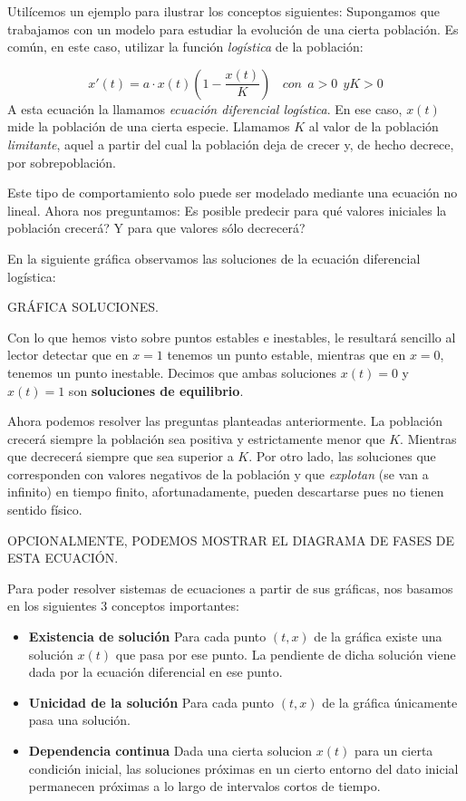 Utilícemos un ejemplo para ilustrar los conceptos siguientes: Supongamos que trabajamos con un modelo para estudiar la evolución de una cierta población. Es común, en este caso, utilizar la función \emph{logística} de la población:

\begin{equation}
x'(t) = a\cdot x(t)(1-\frac{x(t)}{K})~~~~con~~a>0~~yK>0
\end{equation}
A esta ecuación la llamamos \emph{ecuación diferencial logística}. En ese caso, $x(t)$ mide la población de una cierta especie. Llamamos $K$ al valor de la población \emph{limitante}, aquel a partir del cual la población deja de crecer y, de hecho decrece, por sobrepoblación.

Este tipo de comportamiento solo puede ser modelado mediante una ecuación no lineal. Ahora nos preguntamos: Es posible predecir para qué valores iniciales la población crecerá? Y para que valores sólo decrecerá?

En la siguiente gráfica observamos las soluciones de la ecuación diferencial logística:\newline

GRÁFICA SOLUCIONES.\newline

Con lo que hemos visto sobre puntos estables e inestables, le resultará sencillo al lector detectar que en $x=1$ tenemos un punto estable, mientras que en $x=0$, tenemos un punto inestable. Decimos que ambas soluciones $x(t) = 0$ y $x(t) = 1$ son \textbf{soluciones de equilibrio}. 

Ahora podemos resolver las preguntas planteadas anteriormente. La población crecerá siempre la población sea positiva y estrictamente menor que $K$. Mientras que decrecerá siempre que sea superior a $K$. Por otro lado, las soluciones que corresponden con valores negativos de la población y que \emph{explotan} (se van a infinito) en tiempo finito, afortunadamente, pueden descartarse pues no tienen sentido físico.\newline

OPCIONALMENTE, PODEMOS MOSTRAR EL DIAGRAMA DE FASES DE ESTA ECUACIÓN.\newline

Para poder resolver sistemas de ecuaciones a partir de sus gráficas, nos basamos en los siguientes 3 conceptos importantes:

\begin{itemize}
\item \textbf{Existencia de solución} Para cada punto $(t,x)$ de la gráfica existe una  solución $x(t)$ que pasa por ese punto. La pendiente de dicha solución viene dada por la ecuación diferencial en ese punto.
\item \textbf{Unicidad de la solución} Para cada punto $(t,x)$ de la gráfica únicamente pasa una solución.
\item \textbf{Dependencia continua} Dada una cierta solucion $x(t)$ para un cierta condición inicial, las soluciones próximas en un cierto entorno del dato inicial permanecen próximas a lo largo de intervalos cortos de tiempo. 
\end{itemize}

